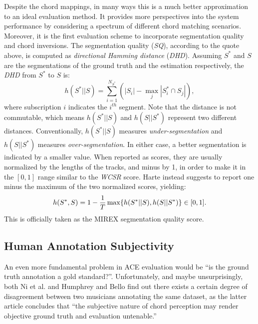 Despite the chord mappings, in many ways this is a much better approximation to an ideal evaluation method. It provides more perspectives into the system performance by considering a spectrum of different chord matching scenarios. Moreover, it is the first evaluation scheme to incorporate segmentation quality and chord inversions. The segmentation quality (\textit{SQ}), according to the quote above, is computed as {\it directional Hamming distance} (\textit{DHD}). Assuming $S^*$ and $S$ are the segmentations of the ground truth and the estimation respectively, the \textit{DHD} from $S^*$ to $S$ is:
\begin{equation}
h(S^*||S) = \sum_{i=1}^{N_{S^*}}(|S_i|-\max_j|S_i^* \cap S_j|),
\end{equation}
where subscription $i$ indicates the $i^{th}$ segment. Note that the distance is not commutable, which means $h(S^*||S)$ and $h(S||S^*)$ represent two different distances. Conventionally, $h(S^*||S)$ measures {\it under-segmentation} and $h(S||S^*)$ measures {\it over-segmentation}. In either case, a better segmentation is indicated by a smaller value. When reported as scores, they are usually normalized by the lengths of the tracks, and minus by 1, in order to make it in the $[0,1]$ range similar to the \textit{WCSR} score. Harte \cite{harte2010towards} instead suggests to report one minus the maximum of the two normalized scores, yielding:
\begin{equation}
h(S^*,S)=1-{1\over T}\max\{h(S^*||S), h(S||S^*)\} \in [0,1].
\end{equation}
This is officially taken as the MIREX segmentation quality score.

\subsection{Human Annotation Subjectivity} \label{sec:2-subjectivity}
An even more fundamental problem in ACE evaluation would be ``is the ground truth annotation a gold standard?''. Unfortunately, and maybe unsurprisingly, both Ni et al. \cite{ni2013understanding} and Humphrey and Bello \cite{humphreyfour} find out there exists a certain degree of disagreement between two musicians annotating the same dataset, as the latter article concludes that ``the subjective nature of chord perception may render objective ground truth and evaluation untenable.''

